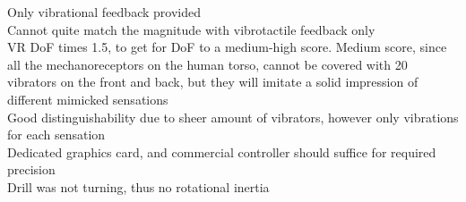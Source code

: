 \footnotemark[47]Only vibrational feedback provided  \\
\footnotemark[48]Cannot quite match the magnitude with vibrotactile feedback only \\
\footnotemark[49]VR DoF times 1.5, to get for DoF to a medium-high score. Medium score, since all the mechanoreceptors on the human torso, cannot be covered with 20 vibrators on the front and back, but they will imitate a solid impression of different mimicked sensations \\
\footnotemark[50]Good distinguishability due to sheer amount of vibrators, however only vibrations for each sensation \\
\footnotemark[51]Dedicated graphics card, and commercial controller should suffice for required precision \\
\footnotemark[52]Drill was not turning, thus no rotational inertia \\